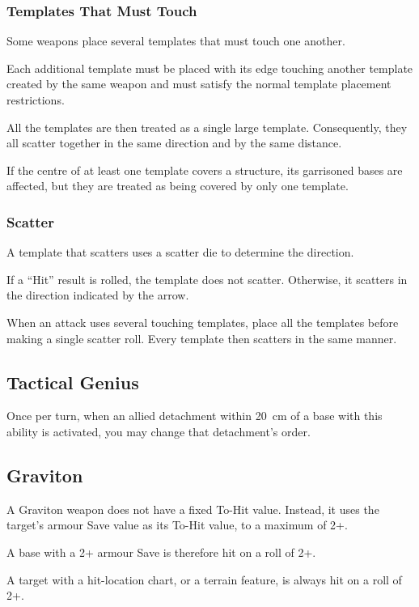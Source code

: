 \subsubsection{Templates That Must Touch}

Some weapons place several templates that must touch one another.

Each additional template must be placed with its edge touching another template created by the same weapon and must satisfy the normal template placement restrictions.

All the templates are then treated as a single large template. Consequently, they all scatter together in the same direction and by the same distance.

If the centre of at least one template covers a structure, its garrisoned bases are affected, but they are treated as being covered by only one template.

\subsubsection{Scatter}

A template that scatters uses a scatter die to determine the direction.

If a ``Hit'' result is rolled, the template does not scatter. Otherwise, it scatters in the direction indicated by the arrow.

When an attack uses several touching templates, place all the templates before making a single scatter roll. Every template then scatters in the same manner.

\subsection{Tactical Genius}

Once per turn, when an allied detachment within 20~cm of a base with this ability is activated, you may change that detachment's order.

\subsection{Graviton}

A Graviton weapon does not have a fixed To-Hit value. Instead, it uses the target's armour Save value as its To-Hit value, to a maximum of 2+.

A base with a 2+ armour Save is therefore hit on a roll of 2+.

A target with a hit-location chart, or a terrain feature, is always hit on a roll of 2+.

